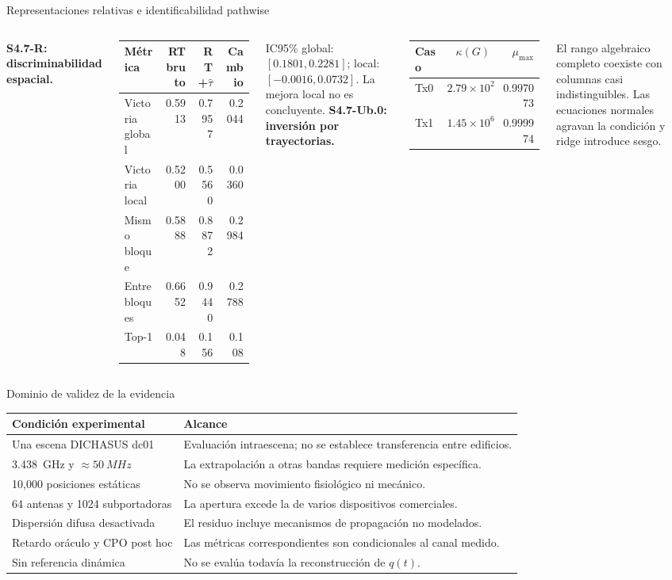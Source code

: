 \documentclass[10pt,aspectratio=169]{beamer}
\begin{document}
\begin{frame}{Representaciones relativas e identificabilidad pathwise}
\scriptsize
\begin{columns}[T]
\textbf{S4.7-R: discriminabilidad espacial.}
\begin{table}
\centering
\begin{tabular}{lrrr}
\toprule
Métrica & RT bruto & RT+$\widehat\tau$ & Cambio\\
\midrule
Victoria global & 0.5913 & 0.7957 & 0.2044\\
Victoria local & 0.5200 & 0.5560 & 0.0360\\
Mismo bloque & 0.5888 & 0.8872 & 0.2984\\
Entre bloques & 0.6652 & 0.9440 & 0.2788\\
Top-1 & 0.048 & 0.156 & 0.108\\
\bottomrule
\end{tabular}
\end{table}
IC95\% global: $[0.1801,0.2281]$; local: $[-0.0016,0.0732]$. La mejora local no
es concluyente.
\textbf{S4.7-Ub.0: inversión por trayectorias.}
\begin{table}
\centering
\begin{tabular}{lrr}
\toprule
Caso & $\kappa(G)$ & $\mu_{\max}$\\
\midrule
Tx0 & $2.79\times10^2$ & 0.997073\\
Tx1 & $1.45\times10^6$ & 0.999974\\
\bottomrule
\end{tabular}
\end{table}
El rango algebraico completo coexiste con columnas casi indistinguibles. Las
ecuaciones normales agravan la condición y ridge introduce sesgo.
\end{columns}
\end{frame}

\begin{frame}{Dominio de validez de la evidencia}
\small
\begin{tabularx}{\textwidth}{P{4.5cm}Y}
\toprule
Condición experimental & Alcance\\
\midrule
Una escena DICHASUS dc01 & Evaluación intraescena; no se establece transferencia entre edificios.\\
\SI{3.438}{GHz} y $\approx\SI{50}{MHz}$ & La extrapolación a otras bandas requiere medición específica.\\
10,000 posiciones estáticas & No se observa movimiento fisiológico ni mecánico.\\
64 antenas y 1024 subportadoras & La apertura excede la de varios dispositivos comerciales.\\
Dispersión difusa desactivada & El residuo incluye mecanismos de propagación no modelados.\\
Retardo oráculo y CPO post hoc & Las métricas correspondientes son condicionales al canal medido.\\
Sin referencia dinámica & No se evalúa todavía la reconstrucción de $q(t)$.\\
\bottomrule
\end{tabularx}
\end{frame}
\end{document}
